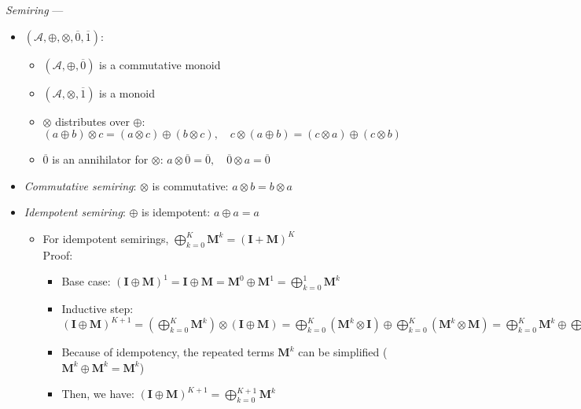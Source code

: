 \emph{Semiring} ---
\begin{itemize}
    \item $(\mathcal{A}, \oplus, \otimes, \overline{0}, \overline{1})$:
    \begin{itemize}
        \item $(\mathcal{A}, \oplus, \overline{0})$ is a commutative monoid
        \item $(\mathcal{A}, \otimes, \overline{1})$ is a monoid
        \item $\otimes$ distributes over $\oplus$:
        $
        (a \oplus b) \otimes c = (a \otimes c) \oplus (b \otimes c), \quad
        c \otimes (a \oplus b) = (c \otimes a) \oplus (c \otimes b)
        $
        \item $\overline{0}$ is an annihilator for $\otimes$:
        $
        a \otimes \overline{0} = \overline{0}, \quad \overline{0} \otimes a = \overline{0}
        $
    \end{itemize}
    \item \emph{Commutative semiring}: $\otimes$ is commutative: $a \otimes b = b \otimes a$
    \item \emph{Idempotent semiring}: $\oplus$ is idempotent: $a \oplus a = a$
    \begin{itemize}
        \item For idempotent semirings, $\bigoplus_{k=0}^{K} \boldsymbol{M}^k = ( \boldsymbol{I} + \boldsymbol{M})^{K}$\\
        Proof:
        \begin{itemize}
            \item Base case: $(\boldsymbol{I} \oplus \boldsymbol{M})^1 = \boldsymbol{I} \oplus \boldsymbol{M} = \boldsymbol{M}^0 \oplus \boldsymbol{M}^1 = \bigoplus_{k=0}^1 \boldsymbol{M}^k$
            \item Inductive step: $(\boldsymbol{I} \oplus \boldsymbol{M})^{K+1} = \left( \bigoplus_{k=0}^K \boldsymbol{M}^k \right) \otimes (\boldsymbol{I} \oplus \boldsymbol{M}) = \bigoplus_{k=0}^K (\boldsymbol{M}^k \otimes \boldsymbol{I}) \oplus \bigoplus_{k=0}^K (\boldsymbol{M}^k \otimes \boldsymbol{M}) = \bigoplus_{k=0}^K \boldsymbol{M}^k \oplus \bigoplus_{k=0}^K \boldsymbol{M}^{k+1} = \bigoplus_{k=0}^K \boldsymbol{M}^k \oplus \bigoplus_{k=1}^{K+1} \boldsymbol{M}^k$
            \item Because of idempotency, the repeated terms $ \boldsymbol{M}^k $ can be simplified ($ \boldsymbol{M}^k \oplus \boldsymbol{M}^k = \boldsymbol{M}^k$)
            \item Then, we have: $(\boldsymbol{I} \oplus \boldsymbol{M})^{K+1} = \bigoplus_{k=0}^{K+1} \boldsymbol{M}^k$

\end{itemize}
\end{itemize}
\end{itemize}
